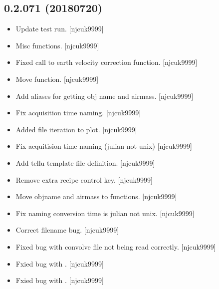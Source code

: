 \documentclass[a4paper,10pt,english]{report}
\begin{document}
\subsection{0.2.071 (2018\sphinxhyphen{}07\sphinxhyphen{}20)}
\label{\detokenize{misc/changelog:id405}}\begin{itemize}
\item {} 
Update test run. {[}njcuk9999{]}

\item {} 
Misc functions. {[}njcuk9999{]}

\item {} 
Fixed call to earth velocity correction function. {[}njcuk9999{]}

\item {} 
Move  function. {[}njcuk9999{]}

\item {} 
Add aliases for getting obj name and airmass. {[}njcuk9999{]}

\item {} 
Fix acquisition time naming. {[}njcuk9999{]}

\item {} 
Added file iteration to plot. {[}njcuk9999{]}

\item {} 
Fix acquitision time naming (julian not unix) {[}njcuk9999{]}

\item {} 
Add tellu template file definition. {[}njcuk9999{]}

\item {} 
Remove extra recipe control key. {[}njcuk9999{]}

\item {} 
Move objname and airmass to functions. {[}njcuk9999{]}

\item {} 
Fix naming conversion time is julian not unix. {[}njcuk9999{]}

\item {} 
Correct filename bug. {[}njcuk9999{]}

\item {} 
Fixed bug with convolve file not being read correctly. {[}njcuk9999{]}

\item {} 
Fxied bug with . {[}njcuk9999{]}

\item {} 
Fxied bug with . {[}njcuk9999{]}


\end{itemize}
\end{document}
